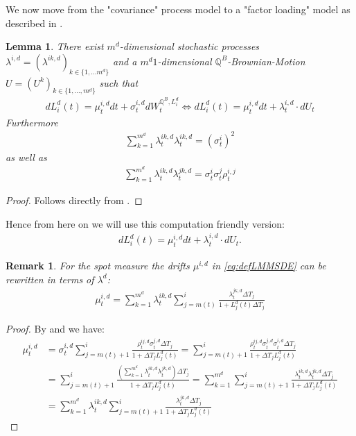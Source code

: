 \documentclass[12pt]{article}
\newtheorem{lemma}[theorem]{Lemma}
\newtheorem{remark}[theorem]{Remark}
\begin{document}
	We now move from the "covariance" process model to a "factor loading" model as described in .\\
	\begin{lemma}\label{lem:defLMMFactorVersion}
		There exist $m^d$-dimensional stochastic processes $\lambda^{i,d} = (\lambda^{i k, d})_{k \in \{1, ... m^d\}}$ and a $m^d 1$-dimensional $\mathbb{Q}^B$-Brownian-Motion $U=(U^k)_{k \in \{1,...,m^d\}}$ such that
		\begin{align*}
			dL^d_i(t) = \mu^{i, d}_t dt + \sigma^{i, d}_t dW^{\mathbb{Q}^B, L^d_i}_t \iff 
			dL^d_i(t) = \mu^{i, d}_t dt + \lambda^{i,d}_t\cdot dU_t
		\end{align*}
		Furthermore
		\begin{align*}
			\sum_{k=1}^{m^d}\lambda^{i k, d}_t \lambda^{i k, d}_t = (\sigma^i_t)^2
		\end{align*}
		as well as
		\begin{align*}
			\sum_{k=1}^{m^d}\lambda^{i k, d}_t \lambda^{j k, d}_t = \sigma^i_t \sigma^j_t \rho^{i,j}_t
		\end{align*}
	\end{lemma}
	\begin{proof}
		Follows directly from . %
	\end{proof}
	Hence from here on we will use this computation friendly version:
	\begin{align}\label{eq:defLMMSDE}
			dL^d_i(t) = \mu^{i, d}_t dt + \lambda^{i,d}_t\cdot dU_t.
	\end{align}
	\begin{remark}\label{rem:defLMMDrift}
		For the spot measure the drifts $\mu^{i,d}$ in \cref{eq:defLMMSDE} can be rewritten in terms of $\lambda^{d}$:
		\begin{align*}
			\mu^{i,d}_t = \sum_{k=1}^{m^d}\lambda^{i k, d}_t \sum_{j=m(t)}^{i}\frac{\lambda^{j k, d}_t\Delta T_j}{1 + L^d_j(t)\Delta T_j}
		\end{align*}
	\end{remark}
	\begin{proof}
		By  and  we have:
		\begin{align*}
			\mu^{i, d}_t &= \sigma^{i, d}_t\sum_{j=m(t)+1}^{i}\frac{\rho^{i j, d}_t \sigma^{j, d}_t\Delta T_j}{1 + \Delta T_j L^d_j(t)} = \sum_{j=m(t)+1}^{i}\frac{\rho^{i j, d}_t \sigma^{j, d}_t \sigma^{i, d}_t\Delta T_j}{1 + \Delta T_j L^d_j(t)}\\
			&= \sum_{j=m(t)+1}^{i}\frac{\left(\sum_{k=1}^{m^d}\lambda^{i k,d}_t\lambda^{j k,d}_t\right)\Delta T_j}{1 + \Delta T_j L^d_j(t)}
			=\sum_{k=1}^{m^d}\sum_{j=m(t)+1}^{i}\frac{\lambda^{i k,d}_t\lambda^{j k,d}_t\Delta T_j}{1 + \Delta T_j L^d_j(t)}\\
			&= \sum_{k=1}^{m^d}\lambda^{i k,d}_t\sum_{j=m(t)+1}^{i}\frac{\lambda^{j k,d}_t\Delta T_j}{1 + \Delta T_j L^d_j(t)}
		\end{align*}
	\end{proof}
	
\end{document}
